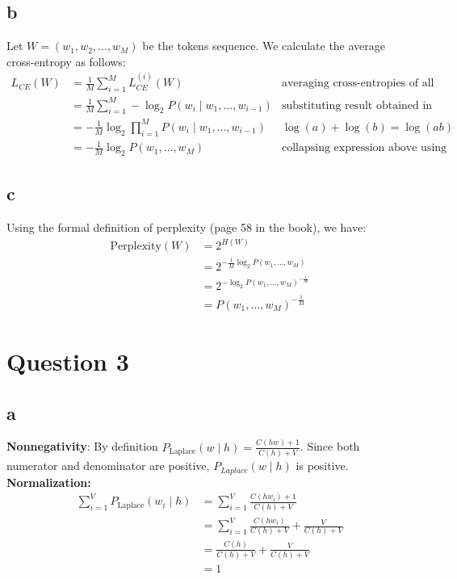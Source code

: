 \documentclass{article}
\numberwithin{equation}{section}
\begin{document}
    \subsection*{b}
    Let $W = (w_1,w_2,\dots,w_M)$ be the tokens sequence.
    We calculate the average cross-entropy as follows:
    \begin{align*}
        L_{CE}(W) &= \frac{1}{M} \sum_{i=1}^{M}L^{(i)}_{CE}(W) & \text{averaging cross-entropies of all steps} \\
            &= \frac{1}{M}\sum_{i=1}^{M}-\log_{2}P(w_{i} \mid w_{1}, \dots, w_{i-1}) & \text{substituting result obtained in section (a)}\\
            &= -\frac{1}{M}\log_{2}\prod_{i=1}^{M}P(w_{i} \mid w_{1}, \dots, w_{i-1}) & \log(a) + \log(b) = \log(ab) \\
            &= -\frac{1}{M}\log_{2}P(w_{1}, \dots, w_{M}) & \text{collapsing expression above using the chain rule}
    \end{align*}

    \subsection*{c}
    Using the formal definition of perplexity (page 58 in the book), we have:
    \begin{align*}
        \text{Perplexity}(W) &= 2^{H(W)} \\
            &= 2^{-\frac{1}{M}\log_{2}{P(w_1, \dots, w_M)}} \\
            &= 2^{-\log_{2}{P(w_1, \dots, w_M)^{-\frac{1}{M}}}} \\
            &= P(w_1, \dots, w_M)^{-\frac{1}{M}}
    \end{align*}


    \section*{Question 3}
    \subsection*{a}

    \textbf{Nonnegativity}: By definition $P_{\mathrm{Laplace}}(w \mid h) = \frac{C(hw) + 1}{C(h) + V}$.
    Since both numerator and denominator are positive, $P_{Laplace}(w \mid h)$ is positive.\\

    \noindent\textbf{Normalization:}
    \begin{align*}
        \sum_{i = 1}^{V}P_{\mathrm{Laplace}}(w_i \mid h) &= \sum_{i = 1}^{V}\frac{C(hw_i) + 1}{C(h) + V}  \\
            &= \sum_{i = 1}^{V}\frac{C(hw_i)}{C(h) + V} + \frac{V}{C(h) + V} \\
            &= \frac{C(h)}{C(h) + V} + \frac{V}{C(h) + V} \\
            &= 1
    \end{align*}
\end{document}
